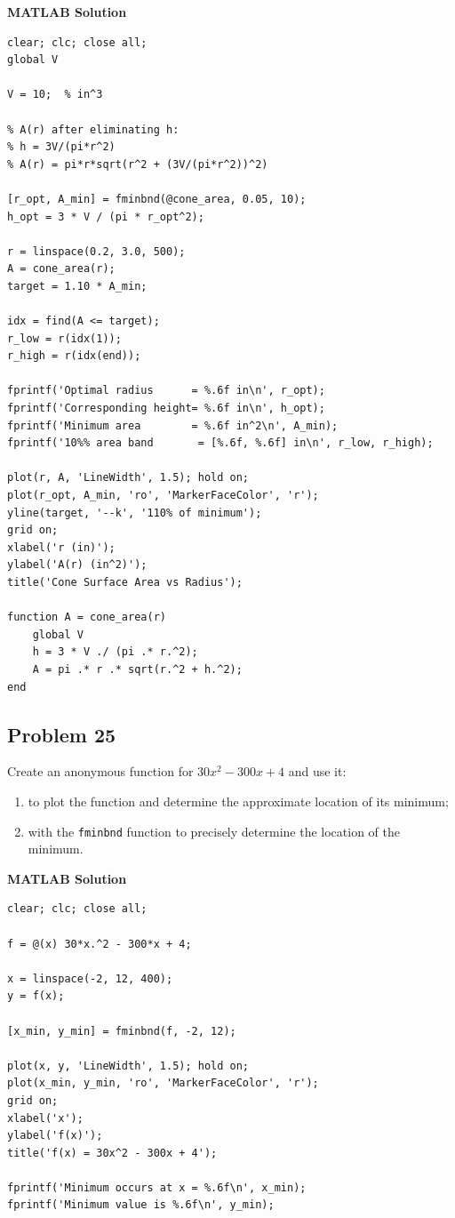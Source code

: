 \documentclass[12pt]{article}
\newcommand{\questiontitle}[2]{%
    \phantomsection
    \hypertarget{#1}{}%
    \subsection*{#2}
}
\newcommand{\solutiontitle}{\noindent\textbf{MATLAB Solution}}
\begin{document}
\solutiontitle
\begin{lstlisting}
clear; clc; close all;
global V

V = 10;  % in^3

% A(r) after eliminating h:
% h = 3V/(pi*r^2)
% A(r) = pi*r*sqrt(r^2 + (3V/(pi*r^2))^2)

[r_opt, A_min] = fminbnd(@cone_area, 0.05, 10);
h_opt = 3 * V / (pi * r_opt^2);

r = linspace(0.2, 3.0, 500);
A = cone_area(r);
target = 1.10 * A_min;

idx = find(A <= target);
r_low = r(idx(1));
r_high = r(idx(end));

fprintf('Optimal radius      = %.6f in\n', r_opt);
fprintf('Corresponding height= %.6f in\n', h_opt);
fprintf('Minimum area        = %.6f in^2\n', A_min);
fprintf('10%% area band       = [%.6f, %.6f] in\n', r_low, r_high);

plot(r, A, 'LineWidth', 1.5); hold on;
plot(r_opt, A_min, 'ro', 'MarkerFaceColor', 'r');
yline(target, '--k', '110% of minimum');
grid on;
xlabel('r (in)');
ylabel('A(r) (in^2)');
title('Cone Surface Area vs Radius');

function A = cone_area(r)
    global V
    h = 3 * V ./ (pi .* r.^2);
    A = pi .* r .* sqrt(r.^2 + h.^2);
end
\end{lstlisting}

\questiontitle{tut3-q25}{Problem 25}
Create an anonymous function for $30x^{2} - 300x + 4$ and use it:
\begin{enumerate}[label=\alph*.]
    \item to plot the function and determine the approximate location of its minimum;
    \item with the \texttt{fminbnd} function to precisely determine the location of the minimum.
\end{enumerate}

\solutiontitle
\begin{lstlisting}
clear; clc; close all;

f = @(x) 30*x.^2 - 300*x + 4;

x = linspace(-2, 12, 400);
y = f(x);

[x_min, y_min] = fminbnd(f, -2, 12);

plot(x, y, 'LineWidth', 1.5); hold on;
plot(x_min, y_min, 'ro', 'MarkerFaceColor', 'r');
grid on;
xlabel('x');
ylabel('f(x)');
title('f(x) = 30x^2 - 300x + 4');

fprintf('Minimum occurs at x = %.6f\n', x_min);
fprintf('Minimum value is %.6f\n', y_min);
\end{lstlisting}
\end{document}
